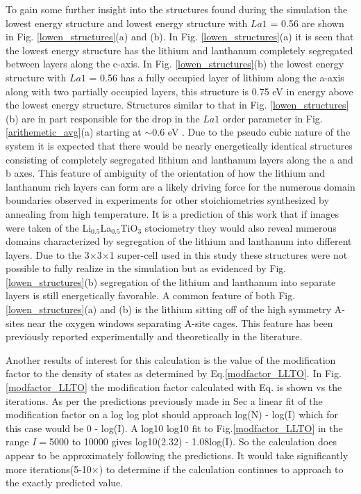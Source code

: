 \documentclass[aps,pre,reprint,superscriptaddress,showkeys]{revtex4-2}
\begin{document}
To gain some further insight into the structures found during the simulation the  lowest energy structure and lowest energy structure with $La1$ = 0.56  are  shown in  Fig. \ref{lowen_structures}(a) and (b). In Fig. \ref{lowen_structures}(a) it is seen that the lowest energy structure has the lithium and lanthanum completely segregated between layers along the c-axis. In Fig. \ref{lowen_structures}(b)  the  lowest energy structure with $La1$ = 0.56  has a fully occupied layer of lithium along the a-axis along with two partially occupied layers, this structure is 0.75 eV in energy above the lowest energy structure. Structures similar to that in Fig. \ref{lowen_structures}(b) are in part responsible for the drop in the $La1$ order parameter in Fig. \ref{arithemetic_avg}(a) starting at $\sim$0.6 eV .  Due to the pseudo cubic nature of the system it is expected that there would be nearly energetically identical structures  consisting of completely segregated lithium and lanthanum layers along the a and b axes. This feature of ambiguity of the orientation of how the lithium and lanthanum rich layers can form  are a likely driving force for the numerous domain boundaries observed in experiments for other stoichiometries synthesized by annealing from high temperature\cite{imaginaryphonons,domainboundaries}. It is a prediction of this work that if images were taken of the Li$_0.5$La$_0.5$TiO$_3$ stociometry they would also reveal numerous domains characterized by segregation of the lithium and lanthanum into different layers.  Due to the 3$\times$3$\times$1 super-cell used in this study these structures were not possible to fully realize in the simulation but as evidenced by Fig. \ref{lowen_structures}(b) segregation of the lithium and lanthanum into separate layers is still energetically favorable. A common feature of both Fig. \ref{lowen_structures}(a) and (b) is the lithium sitting off of the high symmetry A-sites near the oxygen windows separating A-site cages. This feature has been previously reported experimentally and theoretically in the literature\cite{Asitedistribution,imaginaryphonons,Li_La_ordering_computational,lithiumpos}. 

Another results of interest for this calculation is the value of the modification factor to the density of states as determined by Eq.\ref{modfactor_LLTO}. In Fig.\ref{modfactor_LLTO} the modification factor calculated with Eq.  \label{modfactor_LLTO} is shown vs the iterations. As per the predictions previously made in Sec   a linear fit of the modification factor on a log log plot should approach log(N) - log(I) which for this case would be 0 - log(I). A log10 log10 fit to Fig.\ref{modfactor_LLTO} in the range $I=$5000 to 10000 gives log10(2.32) - 1.08log(I). So the calculation does appear to be approximately following the predictions. It would take significantly more iterations(5-10$\times$) to determine if the calculation continues to approach to the exactly predicted value. 
\end{document}
